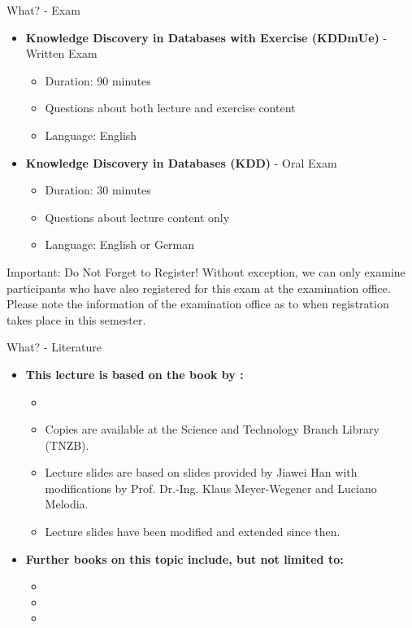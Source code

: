 \begin{frame}{What? - Exam}
	\begin{itemize}
		\item \textbf{Knowledge Discovery in Databases with Exercise (KDDmUe)} - {\color{faugray}Written Exam}
		      \begin{itemize}
			      \item Duration: 90 minutes
			      \item Questions about both lecture and exercise content
			      \item Language: English
		      \end{itemize}
		\item \textbf{Knowledge Discovery in Databases (KDD)} - {\color{faugray}Oral Exam}
		      \begin{itemize}
			      \item Duration: 30 minutes
			      \item Questions about lecture content only
			      \item Language: English or German
		      \end{itemize}
	\end{itemize}
	\begin{alertblock}{Important: Do Not Forget to Register!}
		Without exception, we can only examine participants who have also registered for this exam at the examination office. Please note the information of the examination office as to when registration takes place in this semester.
	\end{alertblock}
\end{frame}

\begin{frame}{What? - Literature}
	\begin{itemize}
		\item \textbf{This lecture is based on the book by \citeauthor{han2011}:}
		      \begin{itemize}
			      \item {}
			      \item {\color{faugray}Copies are available at the Science and Technology Branch Library (TNZB).}
			      \item Lecture slides are based on slides provided by Jiawei Han with modifications by Prof. Dr.-Ing. Klaus Meyer-Wegener and Luciano Melodia.
			      \item Lecture slides have been modified and extended since then.
		      \end{itemize}
		\item \textbf{Further books on this topic include, but not limited to:}
		      \begin{itemize}
			      \item {}
			      \item {}
			      \item {}
		      \end{itemize}
	\end{itemize}
\end{frame}

